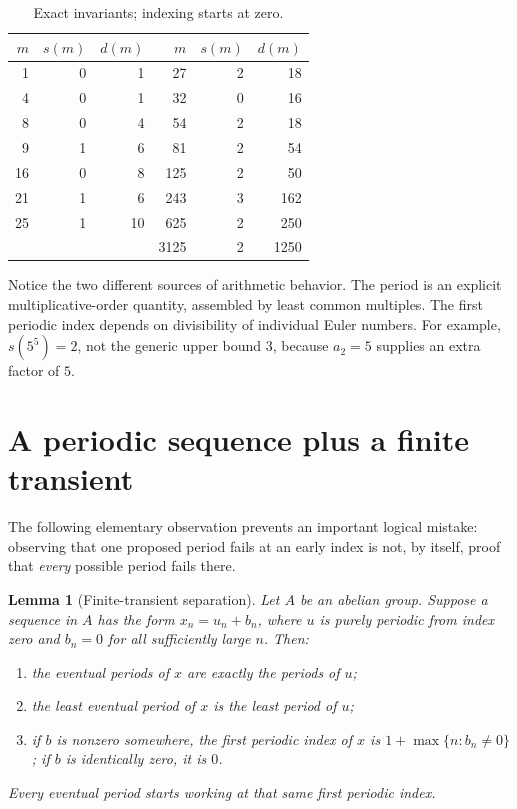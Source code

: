 \documentclass[11pt,a4paper]{article}
\numberwithin{equation}{section}
\newtheorem{lemma}[theorem]{Lemma}
\theoremstyle{definition}
\begin{document}
\begin{table}[htbp]
\centering
\caption{Exact invariants; indexing starts at zero.}
\label{tab:examples}
\begin{tabular}{r r r @{
\qquad} r r r}
\toprule
$m$ & $s(m)$ & $d(m)$ & $m$ & $s(m)$ & $d(m)$\\
\midrule
1&0&1&27&2&18\\
4&0&1&32&0&16\\
8&0&4&54&2&18\\
9&1&6&81&2&54\\
16&0&8&125&2&50\\
21&1&6&243&3&162\\
25&1&10&625&2&250\\
&&&3125&2&1250\\
\bottomrule
\end{tabular}
\end{table}

Notice the two different sources of arithmetic behavior. The period is
an explicit multiplicative-order quantity, assembled by least common
multiples. The first periodic index depends on divisibility of individual
Euler numbers. For example, $s(5^5)=2$, not the generic upper bound $3$,
because $a_2=5$ supplies an extra factor of $5$.

\section{A periodic sequence plus a finite transient}
\label{sec:transient}

The following elementary observation prevents an important logical
mistake: observing that one proposed period fails at an early index is not,
by itself, proof that \emph{every} possible period fails there.

\begin{lemma}[Finite-transient separation]\label{lem:transient}
Let $A$ be an abelian group. Suppose a sequence in $A$ has the form
$x_n=u_n+b_n$, where $u$ is purely periodic from index zero and $b_n=0$
for all sufficiently large $n$. Then:
\begin{enumerate}[label=(\roman*),nosep]
\item the eventual periods of $x$ are exactly the periods of $u$;
\item the least eventual period of $x$ is the least period of $u$;
\item if $b$ is nonzero somewhere, the first periodic index of $x$ is
$1+\max\{n:b_n\ne0\}$; if $b$ is identically zero, it is $0$.
\end{enumerate}
Every eventual period starts working at that same first periodic index.
\end{lemma}
\end{document}
